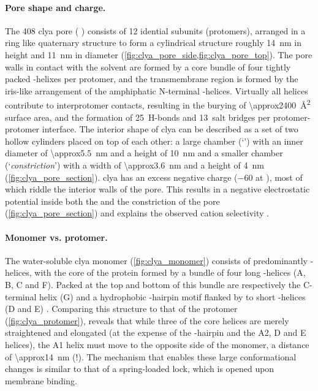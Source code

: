 \paragraph{Pore shape and charge.}
%
The \SI{408}{\kDa} \gls{clya} pore ( \cite{Peng-2019}) consists of 12 idential subunits
(protomers), arranged in a ring like quaternary structure to form a cylindrical structure roughly \SI{14}{\nm}
in height and \SI{11}{\nm} in diameter (\cref{fig:clya_pore_side,fig:clya_pore_top}). The pore walls in
contact with the solvent are formed by a core bundle of four tightly packed \ta-helixes per protomer, and the
transmembrane region is formed by the iris-like arrangement of the amphiphatic N-terminal \ta-helices.
Virtually all helices contribute to interprotomer contacts, resulting in the burying of
\SI{\approx2400}{\square\angstrom} surface area, and the formation of 25~H-bonds and 13~salt bridges per
protomer-protomer interface. The interior shape of \gls{clya} can be described as a set of two hollow
cylinders placed on top of each other: a large \cisi{} chamber (`\lumen{}') with an inner diameter of
\SI{\approx5.5}{\nm} and a height of \SI{10}{\nm} and a smaller \transi{} chamber (`\textit{constriction}')
with a width of \SI{\approx3.6}{\nm} and a height of \SI{4}{\nm} (\cref{fig:clya_pore_section}). \Gls{clya}
has an excess negative charge (\SI{-60}{\ec} at ), most of which riddle the interior walls of the
pore. This results in a negative electrostatic potential inside both the \lumen{} and the constriction of the
pore (\cref{fig:clya_pore_section}) and explains the observed cation selectivity
\cite{Soskine-2012,Franceschini-2016}.

\paragraph{Monomer vs. protomer.}
%
The water-soluble \gls{clya} monomer (\cref{fig:clya_monomer}) consists of predominantly \ta-helices, with the
core of the protein formed by a bundle of four long \ta-helices (\ta A, \ta B, \ta C and \ta F). Packed at the
top and bottom of this bundle are respectively the C-terminal helix (\ta G) and a hydrophobic \tb-hairpin
motif flanked by to short \ta-helices (\ta D and \ta E) \cite{Wallace-2000,Mueller-2009}. Comparing this
structure to that of the protomer (\cref{fig:clya_protomer}), reveals that while three of the core helices are
merely straightened and elongated (at the expense of the \tb-hairpin and the \ta A2, \ta D and \ta E helices),
the \ta A1 helix must move to the opposite side of the monomer, a distance of \SI{\approx14}{\nm} (!). The
mechanism that enables these large conformational changes is similar to that of a spring-loaded lock, which is
opened upon membrane binding.

